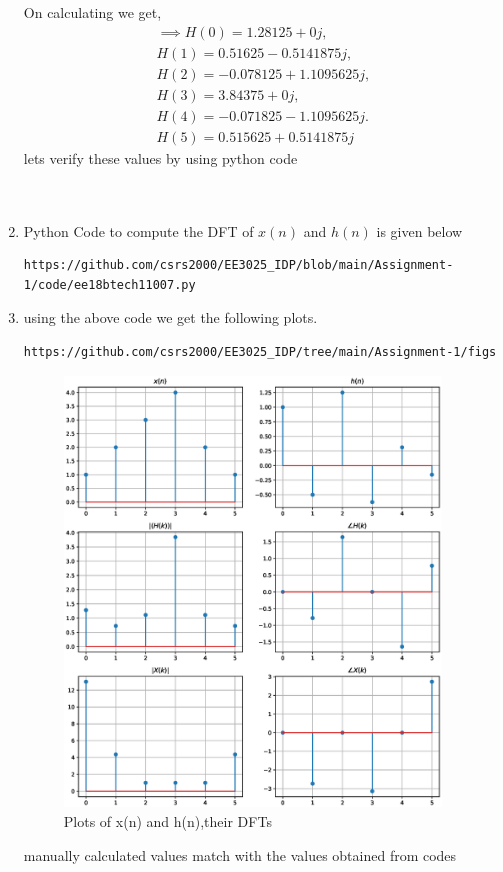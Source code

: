 \documentclass[journal,12pt,twocolumn]{IEEEtran}
\renewcommand\thesection{\arabic{section}}
\begin{document}
\begin{enumerate}[label=\thesection.\arabic*.,ref=\thesection.\theenumi]
On calculating we get,
\begin{align}
\implies H(0) = 1.28125 + 0j,\\
 H(1) = 0.51625 - 0.5141875j,\\
 H(2) = -0.078125 + 1.1095625j,\\
 H(3) = 3.84375 + 0j,\\
 H(4) = -0.071825 - 1.1095625j.\\
 H(5) = 0.515625 + 0.5141875j
\end{align}
lets verify these values by using python code
\\
\\
\\
\item Python Code to compute the DFT of $x(n)$ and $h(n)$ is given below
\begin{lstlisting}
https://github.com/csrs2000/EE3025_IDP/blob/main/Assignment-1/code/ee18btech11007.py
\end{lstlisting}
\item using the above code we get the following plots.
\begin{lstlisting}
https://github.com/csrs2000/EE3025_IDP/tree/main/Assignment-1/figs
\end{lstlisting}
\begin{figure}[h!]
    \centering
    \includegraphics[width=10cm]{./figs/ee18btech11007.eps}
    \caption{Plots of x(n) and h(n),their DFTs}
    \label{figs}
\end{figure}
manually calculated values match with the values obtained from codes
\end{enumerate}
\end{document}
